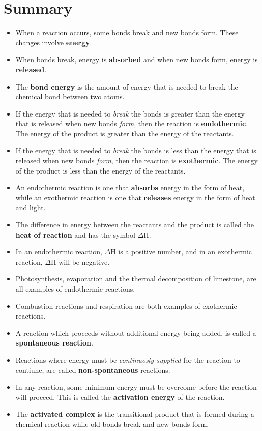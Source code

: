 \section{Summary}

\begin{itemize}
\item{When a reaction occurs, some bonds break and new bonds form. These changes involve \textbf{energy}.}
\item{When bonds break, energy is \textbf{absorbed} and when new bonds form, energy is \textbf{released}.}
\item{The \textbf{bond energy} is the amount of energy that is needed to break the chemical bond between two atoms.}
\item{If the energy that is needed to \textit{break} the bonds is greater than the energy that is released when new bonds \textit{form}, then the reaction is \textbf{endothermic}. The energy of the product is greater than the energy of the reactants.}
\item{If the energy that is needed to \textit{break} the bonds is less than the energy that is released when new bonds \textit{form}, then the reaction is \textbf{exothermic}. The energy of the product is less than the energy of the reactants.}
\item{An endothermic reaction is one that \textbf{absorbs} energy in the form of heat, while an exothermic reaction is one that \textbf{releases} energy in the form of heat and light.}
\item{The difference in energy between the reactants and the product is called the \textbf{heat of reaction} and has the symbol $\Delta$H.}
\item{In an endothermic reaction, $\Delta$H is a positive number, and in an exothermic reaction, $\Delta$H will be negative.}
\item{Photosynthesis, evaporation and the thermal decomposition of limestone, are all examples of endothermic reactions.}
\item{Combustion reactions and respiration are both examples of exothermic reactions.}
\item{A reaction which proceeds without additional energy being added, is called a \textbf{spontaneous reaction}.}
\item{Reactions where energy must be \textit{continuosly supplied} for the reaction to contiune, are called \textbf{non-spontaneous} reactions.}
\item{In any reaction, some minimum energy must be overcome before the reaction will proceed. This is called the \textbf{activation energy} of the reaction.}
\item{The \textbf{activated complex} is the transitional product that is formed during a chemical reaction while old bonds break and new bonds form.}
\end{itemize}

